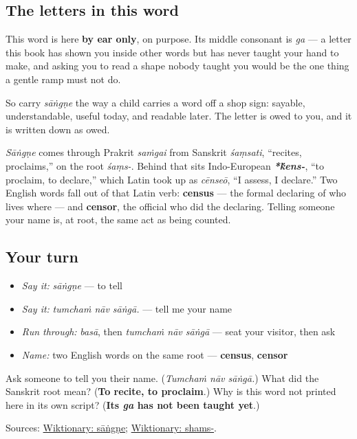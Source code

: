 \subsection*{The letters in this word}
This word is here \textbf{by ear only}, on purpose. Its middle consonant is \emph{ga} — a letter this book has shown you inside other words but has never taught your hand to make, and asking you to read a shape nobody taught you would be the one thing a gentle ramp must not do.

So carry \emph{sāṅgṇe} the way a child carries a word off a shop sign: sayable, understandable, useful today, and readable later. The letter is owed to you, and it is written down as owed.

\begin{cousinweb}
\emph{Sāṅgṇe} comes through Prakrit \emph{saṁgai} from Sanskrit \emph{śaṃsati}, \textquotedblleft{}recites, proclaims,\textquotedblright{} on the root \emph{śaṃs-}. Behind that sits Indo-European \emph{\textbf{*\'{k}ens-}}, \textquotedblleft{}to proclaim, to declare,\textquotedblright{} which Latin took up as \emph{cēnseō}, \textquotedblleft{}I assess, I declare.\textquotedblright{} Two English words fall out of that Latin verb: \textbf{census} — the formal declaring of who lives where — and \textbf{censor}, the official who did the declaring. Telling someone your name is, at root, the same act as being counted.
\end{cousinweb}

\subsection*{Your turn}
\begin{itemize}
\raggedright
  \item \emph{Say it:} \emph{sāṅgṇe} — to tell
  \item \emph{Say it:} \emph{tumchaṁ nāv sāṅgā.} — tell me your name
  \item \emph{Run through:} \emph{basā}, then \emph{tumchaṁ nāv sāṅgā} — seat your visitor, then ask
  \item \emph{Name:} two English words on the same root — \textbf{census}, \textbf{censor}
\end{itemize}

\begin{tcolorbox}[breakable,colback=teal!4,colframe=teal!35!black,title={Before you move on}]
Ask someone to tell you their name. (\emph{Tumchaṁ nāv sāṅgā.}) What did the Sanskrit root mean? (\textbf{To recite, to proclaim}.) Why is this word not printed here in its own script? (\textbf{Its \emph{ga} has not been taught yet}.)

Sources: \href{https://en.wiktionary.org/wiki/\%E0\%A4\%B8\%E0\%A4\%BE\%E0\%A4\%82\%E0\%A4\%97\%E0\%A4\%A3\%E0\%A5\%87}{Wiktionary: sāṅgṇe}; \href{https://en.wiktionary.org/wiki/\%E0\%A4\%B6\%E0\%A4\%82\%E0\%A4\%B8\%E0\%A5\%8D}{Wiktionary: shams-}.
\end{tcolorbox}
